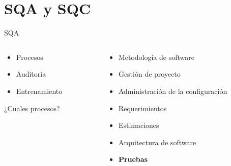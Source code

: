 \documentclass[aspectratio=169]{beamer}
\begin{document}
{
\section{SQA y SQC}
}

\begin{frame}{SQA}
\begin{columns}[T]
	\begin{column}[T]{5cm}
		\begin{itemize}
			\item Procesos
			\item Auditoria
			\item Entrenamiento
		\end{itemize}
	¿Cuales procesos?
	\pause
	\end{column}
	\begin{column}[T]{5cm} %
		\begin{itemize}
			\item Metodología de software
			\item Gestión de proyecto
			\item Administración de la configuración
			\item Requerimientos
			\item Estimaciones
			\item Arquitectura de software
			\item \textbf{Pruebas}
		\end{itemize}
	\end{column}
\end{columns}
\end{frame}
\end{document}
